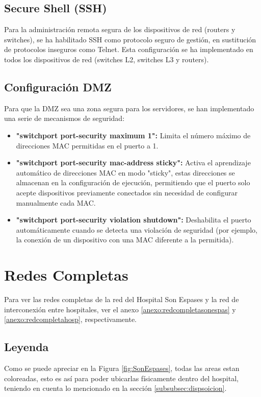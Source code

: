\subsection{Secure Shell (SSH)}
Para la administración remota segura de los dispositivos de red (routers y switches), se ha habilitado SSH como protocolo seguro de gestión, en sustitución de protocolos inseguros como Telnet. 
Esta configuración se ha implementado en todos los dispositivos de red (switches L2, switches L3 y routers). 

\subsection{Configuración DMZ}\label{subsec:dmz}
Para que la DMZ sea una zona segura para los servidores, se han implementado una serie de mecanismos de seguridad:
\begin{itemize}
    \item \textbf{"switchport port-security maximum 1":} Limita el número máximo de direcciones \ac{MAC} permitidas en el puerto a 1.
    \item \textbf{"switchport port-security mac-address sticky":} Activa el aprendizaje automático de direcciones MAC en modo "sticky", estas direcciones se almacenan en la configuración de ejecución, permitiendo que el puerto solo acepte dispositivos previamente conectados sin necesidad de configurar manualmente cada MAC.
    \item \textbf{"switchport port-security violation shutdown":} Deshabilita el puerto automáticamente cuando se detecta una violación de seguridad (por ejemplo, la conexión de un dispositivo con una MAC diferente a la permitida).
\end{itemize}

\section{Redes Completas}

Para ver las redes completas de la red del Hospital Son Espases y la red de interconexión entre hospitales, ver el anexo \ref{anexo:redcompletasonespas} y \ref{anexo:redcompletahosp}, respectivamente.

\subsection{Leyenda}
Como se puede apreciar en la Figura \ref{fig:SonEspases}, todas las areas estan coloreadas, esto es así para poder 
ubicarlas físicamente dentro del hospital, teniendo en cuenta lo mencionado en la sección \ref{subsubsec:dispsoicion}. 

